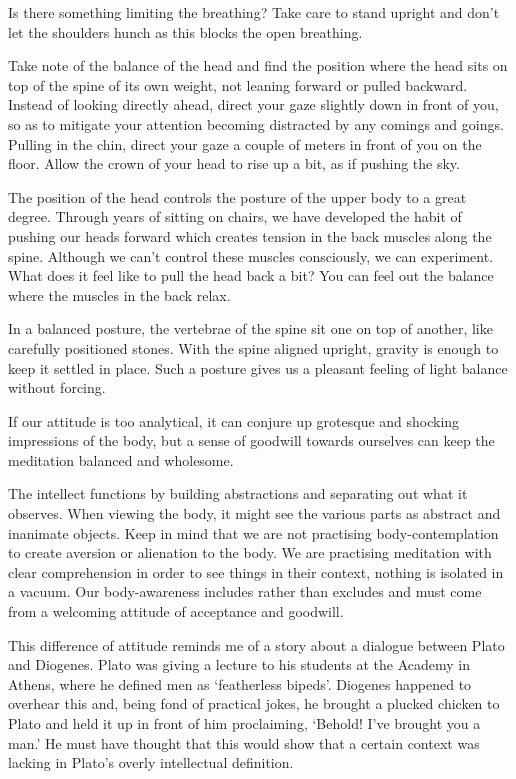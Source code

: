 \enlargethispage*{\baselineskip}

Is there something limiting the breathing? Take care to stand upright
and don't let the shoulders hunch as this blocks the open breathing.

Take note of the balance of the head and find the position where the
head sits on top of the spine of its own weight, not leaning forward or
pulled backward. Instead of looking directly ahead, direct your gaze
slightly down in front of you, so as to mitigate your attention becoming
distracted by any comings and goings. Pulling in the chin, direct your
gaze a couple of meters in front of you on the floor. Allow the crown of
your head to rise up a bit, as if pushing the sky.

The position of the head controls the posture of the upper body to a
great degree. Through years of sitting on chairs, we have developed the
habit of pushing our heads forward which creates tension in the back
muscles along the spine. Although we can't control these muscles
consciously, we can experiment. What does it feel like to pull the head
back a bit? You can feel out the balance where the muscles in the back
relax.

In a balanced posture, the vertebrae of the spine sit one on top of
another, like carefully positioned stones. With the spine aligned
upright, gravity is enough to keep it settled in place. Such a posture
gives us a pleasant feeling of light balance without forcing.


If our attitude is too analytical, it can conjure up grotesque and
shocking impressions of the body, but a sense of goodwill towards
ourselves can keep the meditation balanced and wholesome.

The intellect functions by building abstractions and separating out what
it observes. When viewing the body, it might see the various parts as
abstract and inanimate objects. Keep in mind that we are not practising
body-contemplation to create aversion or alienation to the body. We are
practising meditation with clear comprehension in order to see things in
their context, nothing is isolated in a vacuum. Our body-awareness
includes rather than excludes and must come from a welcoming attitude of
acceptance and goodwill.

This difference of attitude reminds me of a story about a dialogue
between Plato and Diogenes. Plato was giving a lecture to his students
at the Academy in Athens, where he defined men as `featherless bipeds'.
Diogenes happened to overhear this and, being fond of practical jokes,
he brought a plucked chicken to Plato and held it up in front of him
proclaiming, `Behold! I've brought you a man.' He must have thought that
this would show that a certain context was lacking in Plato's overly
intellectual definition.

